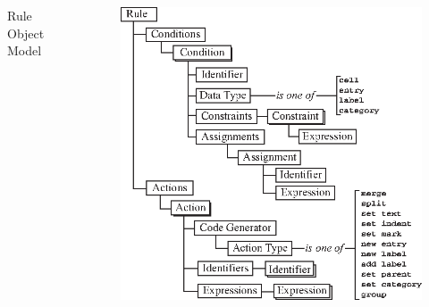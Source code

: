 \documentclass[10pt]{beamer}
\begin{document}
\begin{frame}
\begin{columns}
\small{\centerline{Rule Object Model}}

\begin{figure}
\includegraphics[width=0.8\linewidth]{rulemodel}
\end{figure}
\end{columns}

\end{frame}
\end{document}
